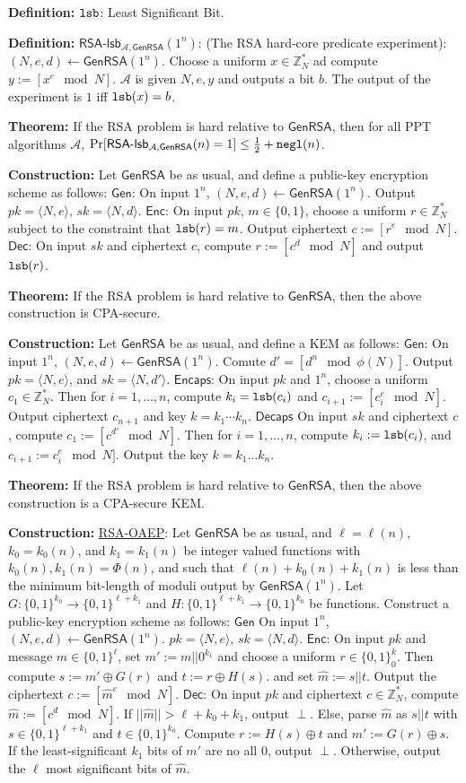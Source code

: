 \documentclass[10pt]{article}
\newcommand{\Z}{\mathbb{Z}}
\newcommand{\AAA}{\mathcal{A}}
\newcommand{\defn}[1]{{\bf Definition:} \underline{#1}}
\newcommand{\thm}[1]{{\bf Theorem:} \underline{#1}}
\newcommand{\con}[1]{{\bf Construction:} \underline{#1}}
\newcommand{\Enc}{\mathsf{Enc}}
\newcommand{\Dec}{\mathsf{Dec}}
\newcommand{\Encaps}{\mathsf{Encaps}}
\newcommand{\Decaps}{\mathsf{Decaps}}
\newcommand{\Gen}{\mathsf{Gen}}
\newcommand{\GenRSA}{\mathsf{GenRSA}}
\newcommand{\ang}[1]{\langle#1\rangle}
\newcommand{\ExptRSAHC}{\mathsf{RSA\text{-}lsb}_{\AAA,\GenRSA}}
\newcommand{\xor}{\oplus}
\newcommand{\negl}{{\tt negl}}
\newcommand{\lsb}{{\tt lsb}}
\newcommand{\from}{\leftarrow}
\begin{document}
\begin{multicols}{3}
\defn{$\lsb$}: Least Significant Bit.

\defn{$\ExptRSAHC(1^n)$}: (The RSA hard-core predicate experiment): $(N,e,d)\from\GenRSA(1^n)$. Choose a uniform $x\in\Z_N^*$ ad compute $y:=[x^e\mod{N}]$. $\AAA$ is given $N,e,y$ and outputs a bit $b$. The output of the experiment is $1$ iff $\lsb(x)=b$.

\thm{}If the RSA problem is hard relative to $\GenRSA$, then for all PPT algorithms $\AAA$, $\Pr[\ExptRSAHC(n)=1]\leq\frac{1}{2}+\negl(n)$.

\con{}Let $\GenRSA$ be as usual, and define a public-key encryption scheme as follows: $\Gen$: On input $1^n$, $(N,e,d)\from\GenRSA(1^n)$. Output $pk=\ang{N,e}$, $sk=\ang{N,d}$. $\Enc$: On input $pk$, $m\in\{0,1\}$, choose a uniform $r\in\Z_N^*$ subject to the constraint that $\lsb(r)=m$. Output ciphertext $c:=[r^e\mod{N}]$. $\Dec$: On input $sk$ and ciphertext $c$, compute $r:=[c^d\mod{N}]$ and output $\lsb(r)$.

\thm{}If the RSA problem is hard relative to $\GenRSA$, then the above construction is CPA-secure.

\con{}Let $\GenRSA$ be as usual, and define a KEM as follows: $\Gen$: On input $1^n$, $(N,e,d)\from\GenRSA(1^n)$. Comute $d'=[d^n\mod{\phi(N)}]$. Output $pk=\ang{N,e}$, and $sk=\ang{N,d'}$. $\Encaps$: On input $pk$ and $1^n$, choose a uniform $c_1\in\Z_N^*$. Then for $i=1,\dots,n$, compute $k_i=\lsb(c_i)$ and $c_{i+1}:=[c_i^e\mod{N}]$. Output ciphertext $c_{n+1}$ and key $k=k_1\cdots k_n$. $\Decaps$ On input $sk$ and ciphertext $c$, compute $c_1:=[c^{d'}\mod{N}]$. Then for $i=1,\dots,n$, compute $k_i:=\lsb(c_i)$, and $c_{i+1}:=c_i^e\mod{N}]$. Output the key $k=k_1\dots k_n$.

\thm{}If the RSA problem is hard relative to $\GenRSA$, then the above construction is a CPA-secure KEM.

\con{RSA-OAEP}: Let $\GenRSA$ be as usual, and $\ell=\ell(n)$, $k_0=k_0(n)$, and $k_1=k_1(n)$ be integer valued functions with $k_0(n),k_1(n)=\Phi(n)$, and such that $\ell(n)+k_0(n)+k_1(n)$ is less than the minimum bit-length of moduli output by $\GenRSA(1^n)$. Let $G:\{0,1\}^{k_0}\to\{0,1\}^{\ell+k_1}$ and $H:\{0,1\}^{\ell+k_1}\to\{0,1\}^{k_0}$ be functions. Construct a public-key encryption scheme as follows: $\Gen$ On input $1^n$, $(N,e,d)\from\GenRSA(1^n)$. $pk=\ang{N,e}$, $sk=\ang{N,d}$. $\Enc$: On input $pk$ and message $m\in\{0,1\}^\ell$, set $m':=m||0^{k_1}$ and choose a uniform $r\in\{0,1\}^k_0$. Then compute $s:=m'\xor G(r)$ and $t:=r\xor H(s)$. and set $\hat{m}:=s||t$. Output the ciphertext $c:=[\hat{m}^e\mod{N}]$. $\Dec$: On input $pk$ and ciphertext $c\in\Z_N^*$, compute $\hat{m}:=[c^d\mod{N}]$. If $||\hat{m}||>\ell+k_0+k_1$, output $\perp$. Else, parse $\hat{m}$ as $s||t$ with $s\in\{0,1\}^{\ell+k_1}$ and $t\in\{0,1\}^{k_0}$. Compute $r:=H(s)\xor t$ and $m':=G(r)\xor s$. If the least-significant $k_1$ bits of $m'$ are no all $0$, output $\perp$. Otherwise, output the $\ell$ most significant bits of $\hat{m}$.


\end{multicols}
\end{document}
